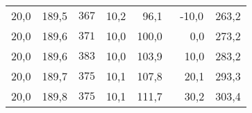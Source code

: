 \begin{table}
\begin{tabular}{S[table-format=2.1] S S S[table-format=2.1] S S S}
          {20,0 } & {189,5}  & {$367$} & 10,2 & {~96,1} & {~-10,0} & 263,2 \\
          {20,0 } & {189,6}  & {$371$} & 10,0 & {100,0} & {~~~0,0} & 273,2 \\
          {20,0 } & {189,6}  & {$383$} & 10,0 & {103,9} & {~~10,0} & 283,2 \\
          {20,0 } & {189,7}  & {$375$} & 10,1 & {107,8} & {~~20,1} & 293,3 \\
          {20,0 } & {189,8}  & {$375$} & 10,1 & {111,7} & {~~30,2} & 303,4 \\
      \bottomrule
    \end{tabular}
\end{table}

 
 
 
 
 
  
 
 
 
 
 

 
 
  
  
  
 
 
 
 

 
  
  
 
  
  
  
 
  
  
 
 
  
  
  
 
  
 
 
 
 
 